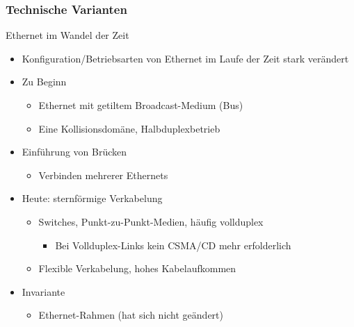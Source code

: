     \subsubsection{Technische Varianten}
      Ethernet im Wandel der Zeit
      \begin{itemize}
        \item Konfiguration/Betriebsarten von Ethernet im Laufe der Zeit stark verändert
        \item Zu Beginn
          \begin{itemize}
            \item Ethernet mit getiltem Broadcast-Medium (Bus)
            \item Eine Kollisionsdomäne, Halbduplexbetrieb
          \end{itemize}
        \item Einführung von Brücken
          \begin{itemize}
            \item Verbinden mehrerer Ethernets
          \end{itemize}
        \item Heute: sternförmige Verkabelung
          \begin{itemize}
            \item Switches, Punkt-zu-Punkt-Medien, häufig vollduplex
              \begin{itemize}
                \item Bei Vollduplex-Links kein CSMA/CD mehr erfolderlich
              \end{itemize}
            \item Flexible Verkabelung, hohes Kabelaufkommen
          \end{itemize}
        \item Invariante
          \begin{itemize}
            \item Ethernet-Rahmen (hat sich nicht geändert)
          \end{itemize}
      \end{itemize}
